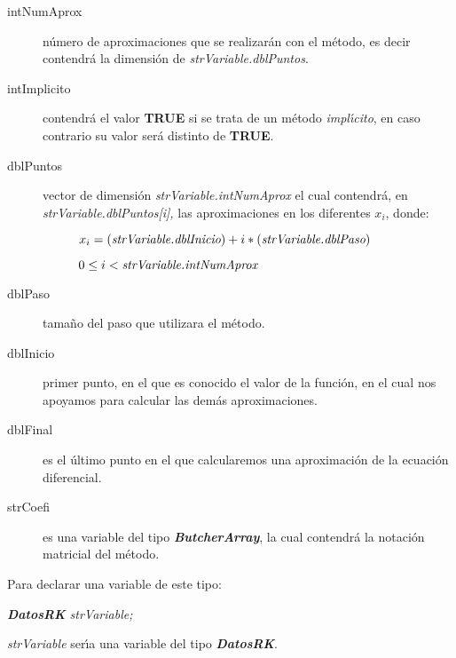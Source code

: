\begin{description}
\item[intNumAprox] n\'umero de aproximaciones que se realizar\'an con el
m\'etodo, es decir contendr\'a la dimensi\'on de \emph{strVariable.dblPuntos}.
\item[intImplicito] contendr\'a el valor \textbf{TRUE} si se trata de un 
m\'etodo \emph{impl\'{\i}cito}, en caso contrario su valor ser\'a distinto de
\textbf{TRUE}.
\item[dblPuntos] vector de dimensi\'on \emph{strVariable.intNumAprox} el 
cual contendr\'a, en \emph{strVariable.dblPuntos[i],} 
las aproximaciones en los diferentes $x_i$, donde:

\begin{description}
\item[]$x_i = (\emph{strVariable.dblInicio}) + i * (\emph{strVariable.dblPaso})$
\item[]$0 \leq i < \emph{strVariable.intNumAprox}$
\end{description}

\item[dblPaso] tama\~no del paso que utilizara el m\'etodo.\newpage
\item[dblInicio] primer punto, en el que es conocido el valor de la funci\'on,
en el cual nos apoyamos para calcular las dem\'as aproximaciones.
\item[dblFinal] es el \'ultimo punto en el que calcularemos una aproximaci\'on
de la ecuaci\'on diferencial.
\item[strCoefi] es una variable del tipo \emph{\textbf{ButcherArray}}, la cual
contendr\'a la notaci\'on matricial del m\'etodo.
\end{description}

Para declarar una variable de este tipo:

\begin{center}
\emph{\textbf{DatosRK} strVariable;}
\end{center}

\emph{strVariable} ser\'{\i}a una variable del tipo \emph{\textbf{DatosRK}}.

\newpage

